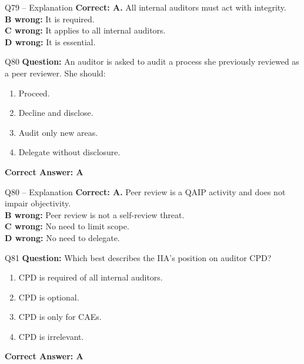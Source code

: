 \documentclass[aspectratio=169,10pt]{beamer}
\begin{document}
	\begin{frame}[t]{Q79 -- Explanation}
		\small
		\textbf{Correct: A.} All internal auditors must act with integrity. \\[4pt]
		\textbf{B wrong:} It is required. \\[2pt]
		\textbf{C wrong:} It applies to all internal auditors. \\[2pt]
		\textbf{D wrong:} It is essential.
	\end{frame}
	
	\begin{frame}[t]{Q80}
		\small
		\textbf{Question:} An auditor is asked to audit a process she previously reviewed as a peer reviewer. She should:
		\begin{enumerate}[label=\Alph*.,itemsep=1pt,topsep=2pt]
			\item Proceed.
			\item Decline and disclose.
			\item Audit only new areas.
			\item Delegate without disclosure.
		\end{enumerate}
		\vspace{4pt}
		\textbf{Correct Answer: A}
	\end{frame}
	
	\begin{frame}[t]{Q80 -- Explanation}
		\small
		\textbf{Correct: A.} Peer review is a QAIP activity and does not impair objectivity. \\[4pt]
		\textbf{B wrong:} Peer review is not a self-review threat. \\[2pt]
		\textbf{C wrong:} No need to limit scope. \\[2pt]
		\textbf{D wrong:} No need to delegate.
	\end{frame}
	
	\begin{frame}[t]{Q81}
		\small
		\textbf{Question:} Which best describes the IIA's position on auditor CPD?
		\begin{enumerate}[label=\Alph*.,itemsep=1pt,topsep=2pt]
			\item CPD is required of all internal auditors.
			\item CPD is optional.
			\item CPD is only for CAEs.
			\item CPD is irrelevant.
		\end{enumerate}
		\vspace{4pt}
		\textbf{Correct Answer: A}
	\end{frame}
	
\end{document}

